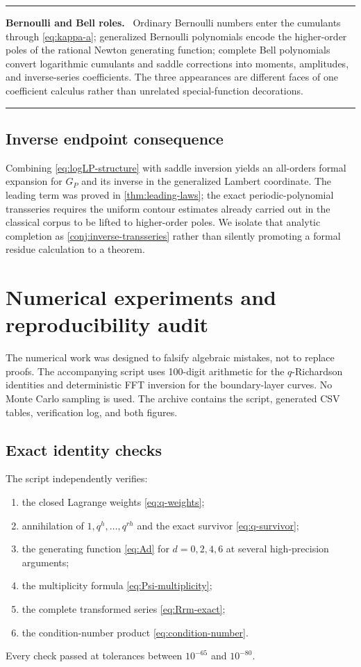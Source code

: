 \documentclass[11pt,oneside]{article}
\numberwithin{equation}{section}
\theoremstyle{definition}
\theoremstyle{remark}
\newenvironment{statusbox}[1]{%
  \par\medskip\noindent\begin{center}\begin{minipage}{0.94\textwidth}%
  \color{linkblue}\hrule\vspace{0.65em}%
  \color{black}\textbf{\color{linkblue}#1.}\ }{%
  \par\vspace{0.65em}\color{linkblue}\hrule
  \end{minipage}\end{center}\medskip}
\begin{document}
\begin{statusbox}{Bernoulli and Bell roles}
Ordinary Bernoulli numbers enter the cumulants through \eqref{eq:kappa-a}; generalized
Bernoulli polynomials encode the higher-order poles of the rational Newton generating
function; complete Bell polynomials convert logarithmic cumulants and saddle corrections into
moments, amplitudes, and inverse-series coefficients.  The three appearances are different
faces of one coefficient calculus rather than unrelated special-function decorations.
\end{statusbox}

\subsection{Inverse endpoint consequence}

Combining \eqref{eq:logLP-structure} with saddle inversion yields an all-orders formal
expansion for $G_P$ and its inverse in the generalized Lambert coordinate.  The leading term
was proved in \cref{thm:leading-laws}; the exact periodic-polynomial transseries requires the
uniform contour estimates already carried out in the classical corpus to be lifted to
higher-order poles.  We isolate that analytic completion as \cref{conj:inverse-transseries}
rather than silently promoting a formal residue calculation to a theorem.


\section{Numerical experiments and reproducibility audit}
\label{sec:numerics}

The numerical work was designed to falsify algebraic mistakes, not to replace proofs.  The
accompanying script  uses 100-digit arithmetic for the
$q$-Richardson identities and deterministic FFT inversion for the boundary-layer curves.
No Monte Carlo sampling is used.  The archive contains the script, generated CSV tables,
verification log, and both figures.

\subsection{Exact identity checks}

The script independently verifies:
\begin{enumerate}
\item the closed Lagrange weights \eqref{eq:q-weights};
\item annihilation of $1,q^h,\ldots,q^{rh}$ and the exact survivor
      \eqref{eq:q-survivor};
\item the generating function \eqref{eq:Ad} for $d=0,2,4,6$ at several high-precision
      arguments;
\item the multiplicity formula \eqref{eq:Psi-multiplicity};
\item the complete transformed series \eqref{eq:Rrm-exact};
\item the condition-number product \eqref{eq:condition-number}.
\end{enumerate}
Every check passed at tolerances between $10^{-65}$ and $10^{-80}$.
\end{document}
